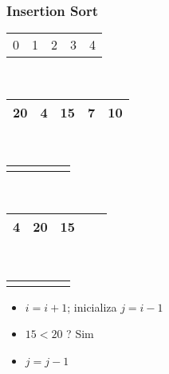 \documentclass{beamer}
\begin{document}
\begin{frame}
    \frametitle{Insertion Sort}
    \begin{center}
        \begin{table}
            \begin{tabular}{p{0.25cm} p{0.25cm} p{0.25cm} p{0.25cm} p{0.25cm}}
                0 & 1 & 2 & 3 & 4
            \end{tabular} \\
            \begin{tabular}{| p{0.25cm} | p{0.25cm} | p{0.25cm} | p{0.25cm} | p{0.25cm} |}
                \hline
                20 & 4 & 15 & 7 & 10 \\ \hline
            \end{tabular} \\
            \begin{tabular}{p{0.25cm} p{0.25cm} p{0.25cm} p{0.25cm} p{0.25cm}}
                & & \color{blue}{$\updownarrow$} & &
            \end{tabular} \\
            \begin{tabular}{| p{0.25cm} | p{0.25cm} | p{0.25cm} | p{0.25cm} | p{0.25cm} |}
                \hline
                4 & 20 & 15 & & \\ \hline
            \end{tabular} \\
            \begin{tabular}{p{0.25cm} p{0.25cm} p{0.25cm} p{0.25cm} p{0.25cm}}
                & \color{red}{$\uparrow$}  & \color{blue}{$\uparrow$} & &
            \end{tabular}
        \end{table}
	\end{center}
    \begin{itemize}[<+->]
        \item $i = i + 1$; inicializa $j = i - 1$
        \item $15 < 20$ ? Sim
        \item $j = j - 1$
    \end{itemize}
\end{frame}
\end{document}
